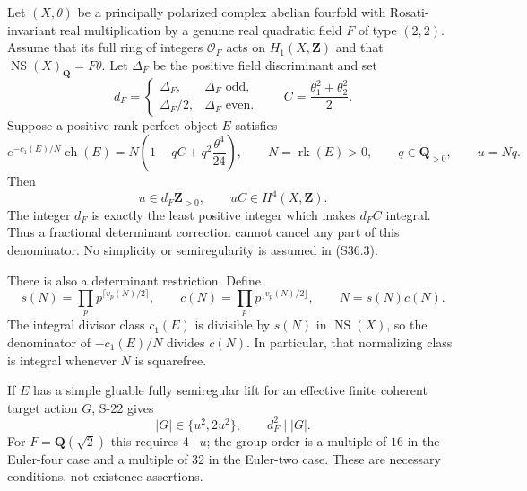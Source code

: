 \begin{theorem}
\label{thm:semireg-rm-exact-denominator}
Let $(X,\theta)$ be a principally polarized complex
abelian fourfold with Rosati-invariant real multiplication
by a genuine real quadratic field $F$ of type $(2,2)$.
Assume that its full ring of integers $\mathcal O_F$
acts on $H_1(X,\mathbf Z)$ and that
$\operatorname{NS}(X)_{\mathbf Q}=F\theta$.
Let $\Delta_F$ be the positive field discriminant and set
\[
 d_F=\begin{cases}
       \Delta_F,&\Delta_F\text{ odd},\\
       \Delta_F/2,&\Delta_F\text{ even}.
      \end{cases}
 \qquad C=\frac{\theta_1^2+\theta_2^2}{2}.
 \tag{S36.1}
\]
Suppose a positive-rank perfect object $E$ satisfies
\[
 e^{-c_1(E)/N}\operatorname{ch}(E)
       =N\left(1-qC+q^2\frac{\theta^4}{24}\right),
 \qquad N=\operatorname{rk}(E)>0,
 \qquad q\in\mathbf Q_{>0},
 \qquad u=Nq.
 \tag{S36.2}
\]
Then
\[
 u\in d_F\mathbf Z_{>0},\qquad uC\in H^4(X,\mathbf Z).
 \tag{S36.3}
\]
The integer $d_F$ is exactly the least positive integer
which makes $d_FC$ integral. Thus a fractional determinant
correction cannot cancel any part of this denominator.
No simplicity or semiregularity is assumed in (S36.3).

There is also a determinant restriction. Define
\[
 s(N)=\prod_p p^{\lceil v_p(N)/2\rceil},\qquad
 c(N)=\prod_p p^{\lfloor v_p(N)/2\rfloor},
 \qquad N=s(N)c(N).
\]
The integral divisor class $c_1(E)$ is divisible by
$s(N)$ in $\operatorname{NS}(X)$, so the denominator of
$-c_1(E)/N$ divides $c(N)$. In particular, that normalizing
class is integral whenever $N$ is squarefree.

If $E$ has a simple gluable fully semiregular lift for an
effective finite coherent target action $G$, S-22 gives
\[
 |G|\in\{u^2,2u^2\},\qquad d_F^2\mid |G|.
 \tag{S36.4}
\]
For $F=\mathbf Q(\sqrt2)$ this requires $4\mid u$;
the group order is a multiple of $16$ in the Euler-four
case and a multiple of $32$ in the Euler-two case.
These are necessary conditions, not existence assertions.
\end{theorem}
